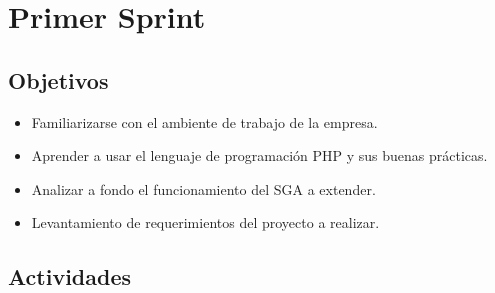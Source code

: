 \section{Primer Sprint} %
\label{sec:primer_sprint}

\subsection{Objetivos}

\begin{itemize}
	\item Familiarizarse con el ambiente de trabajo de la empresa.
	\item Aprender a usar el lenguaje de programación PHP y sus buenas prácticas.
	\item Analizar a fondo el funcionamiento del SGA a extender.
	\item Levantamiento de requerimientos del proyecto a realizar.
\end{itemize}

\subsection{Actividades} %
\label{sub:actividades1}

